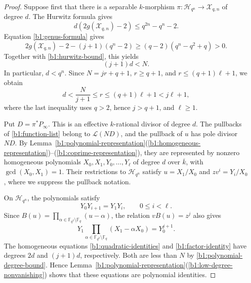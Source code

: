 \documentclass[12pt,reqno]{amsart}
\numberwithin{equation}{section}
\newcommand{\F}{\mathbb F}
\theoremstyle{plain}
\theoremstyle{definition}
\theoremstyle{remark}
\begin{document}
\begin{proof}
Suppose first that there is a separable \(k\)-morphism
\(\pi:\mathcal H_{q^n}\to\mathcal X_{q,n}\) of degree \(d\).
The Hurwitz formula gives
\begin{equation}
\label{b1:hurwitz-bound}
 d(2g(\mathcal X_{q,n})-2)\le q^{2n}-q^n-2.
\end{equation}
Equation \eqref{b1:genus-formula} gives
\[
 2g(\mathcal X_{q,n})-2-(j+1)(q^n-2)
 \ge(q-2)(q^n-q^2+q)>0.
\]
Together with \eqref{b1:hurwitz-bound}, this yields
\begin{equation}
\label{b1:polynomial-degree-bound}
 (j+1)d<N.
\end{equation}
In particular, \(d<q^n\).
Since \(N=jr+q+1\), \(r\ge q+1\), and
\(r\le(q+1)\ell+1\), we obtain
\begin{equation}
\label{b1:cover-degree}
 d<\frac{N}{j+1}\le r\le(q+1)\ell+1<j\ell+1,
\end{equation}
where the last inequality uses \(q>2\), hence \(j>q+1\), and
\(\ell\ge1\).

Put \(D=\pi^*P_\infty\). This is an effective \(k\)-rational
divisor of degree \(d\). The pullbacks of \eqref{b1:function-list}
belong to \(\mathcal L(ND)\), and the pullback of \(u\) has pole
divisor \(ND\). By Lemma~\ref{b1:polynomial-representation}(\ref{b1:homogeneous-representation})--(\ref{b1:coprime-representation}), they
are represented by nonzero homogeneous polynomials
\(X_0,X_1,Y_0,\ldots,Y_\ell\) of degree \(d\) over \(\overline{k}\),
with \(\gcd(X_0,X_1)=1\). Their restrictions to \(\mathcal H_{q^n}\)
satisfy \(u=X_1/X_0\) and \(zv^i=Y_i/X_0\), where we suppress
the pullback notation.

On \(\mathcal H_{q^n}\), the polynomials satisfy
\begin{equation}
\label{b1:quadratic-identities}
 Y_0Y_{i+1}=Y_1Y_i,\qquad 0\le i<\ell.
\end{equation}
Since
\(B(u)=\prod_{\alpha\in\F_{q^2}\setminus\F_q}(u-\alpha)\),
the relation \(vB(u)=z^j\) also gives
\begin{equation}
\label{b1:factor-identity}
 Y_1\prod_{\alpha\in\F_{q^2}\setminus\F_q}
 (X_1-\alpha X_0)=Y_0^{j+1}.
\end{equation}
The homogeneous equations \eqref{b1:quadratic-identities} and
\eqref{b1:factor-identity} have degrees \(2d\) and \((j+1)d\),
respectively. Both are less than \(N\) by
\eqref{b1:polynomial-degree-bound}. Hence
Lemma~\ref{b1:polynomial-representation}(\ref{b1:low-degree-nonvanishing}) shows that these equations
are polynomial identities.


\end{proof}
\end{document}
